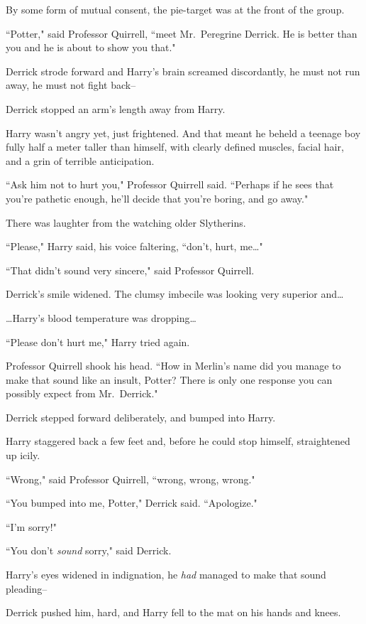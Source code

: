 By some form of mutual consent, the pie-target was at the front of the group.

``Potter," said Professor Quirrell, ``meet Mr.~Peregrine Derrick. He is better than you and he is about to show you that."

Derrick strode forward and Harry's brain screamed discordantly, he must not run away, he must not fight back\---

Derrick stopped an arm's length away from Harry.

Harry wasn't angry yet, just frightened. And that meant he beheld a teenage boy fully half a meter taller than himself, with clearly defined muscles, facial hair, and a grin of terrible anticipation.

``Ask him not to hurt you," Professor Quirrell said. ``Perhaps if he sees that you're pathetic enough, he'll decide that you're boring, and go away."

There was laughter from the watching older Slytherins.

``Please," Harry said, his voice faltering, ``don't, hurt, me{\ldots}"

``That didn't sound very sincere," said Professor Quirrell.

Derrick's smile widened. The clumsy imbecile was looking very superior and{\ldots}

{\ldots}Harry's blood temperature was dropping{\ldots}

``Please don't hurt me," Harry tried again.

Professor Quirrell shook his head. ``How in Merlin's name did you manage to make that sound like an insult, Potter? There is only one response you can possibly expect from Mr.~Derrick."

Derrick stepped forward deliberately, and bumped into Harry.

Harry staggered back a few feet and, before he could stop himself, straightened up icily.

``Wrong," said Professor Quirrell, ``wrong, wrong, wrong."

``You bumped into me, Potter," Derrick said. ``Apologize."

``I'm sorry!"

``You don't \emph{sound} sorry," said Derrick.

Harry's eyes widened in indignation, he \emph{had} managed to make that sound pleading\---

Derrick pushed him, hard, and Harry fell to the mat on his hands and knees.

